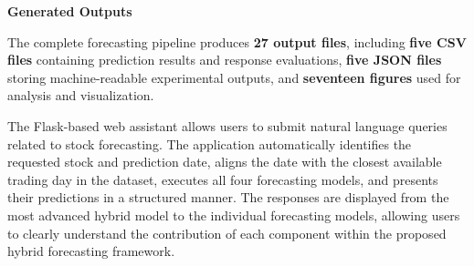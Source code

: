 \textbf{Generated Outputs}

The complete forecasting pipeline produces \textbf{27 output files},
including \textbf{five CSV files} containing prediction results and
response evaluations, \textbf{five JSON files} storing machine-readable
experimental outputs, and \textbf{seventeen figures} used for analysis
and visualization.

The Flask-based web assistant allows users to submit natural language
queries related to stock forecasting. The application automatically
identifies the requested stock and prediction date, aligns the date with
the closest available trading day in the dataset, executes all four
forecasting models, and presents their predictions in a structured
manner. The responses are displayed from the most advanced hybrid model
to the individual forecasting models, allowing users to clearly
understand the contribution of each component within the proposed hybrid
forecasting framework.
